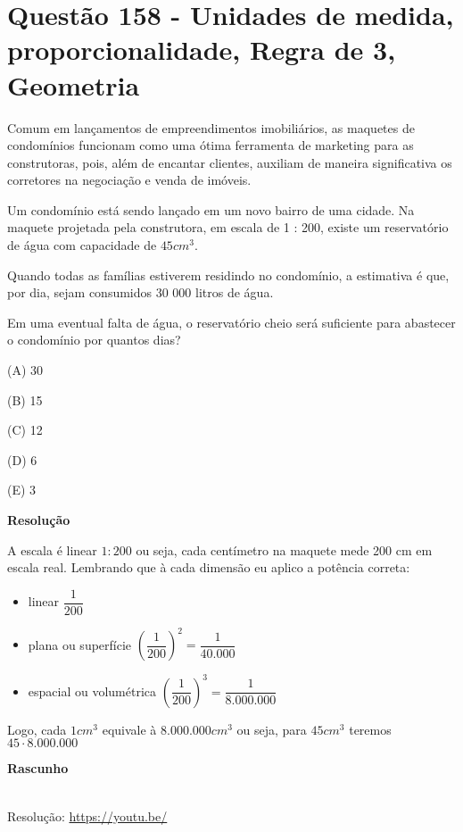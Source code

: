 \section{Questão 158 - Unidades de medida, proporcionalidade, Regra de 3, Geometria}

Comum em lançamentos de empreendimentos imobiliários, as maquetes de condomínios funcionam como uma ótima ferramenta de marketing para as construtoras, pois, além de encantar clientes, auxiliam de maneira significativa os corretores na negociação e venda de imóveis.

Um condomínio está sendo lançado em um novo bairro de uma cidade. Na maquete projetada pela construtora, em escala de 1 : 200, existe um reservatório de água com capacidade de $ 45 cm^3 $.

Quando todas as famílias estiverem residindo no condomínio, a estimativa é que, por dia, sejam consumidos 30 000 litros de água. 

Em uma eventual falta de água, o reservatório cheio será suficiente para abastecer o condomínio por quantos dias?

(A)  30

(B)  15

(C)  12

(D)  6

(E)  3


\textbf{Resolução}

A escala é linear $ 1:200 $  ou seja, cada centímetro na maquete mede 200 cm em escala real.
Lembrando que à cada dimensão eu aplico a potência correta:
\begin{itemize}
    \item linear $ \dfrac{1}{200} $
    \item plana ou superfície $ \left( \dfrac{1}{200} \right)^{2} = \dfrac{1}{40.000}  $
    \item espacial ou volumétrica $ \left( \dfrac{1}{200} \right)^{3} = \dfrac{1}{8.000.000}  $
\end{itemize}

Logo, cada $ 1 cm^3 $ equivale à $ 8.000.000 cm^3 $ ou seja, para $ 45 cm^{3}  $ teremos $ 45 \cdot 8.000.000 $

\textbf{Rascunho}



\begin{center}
    \href{https://youtu.be/}{
    }\\
    Resolução: \url{https://youtu.be/}
\end{center}
